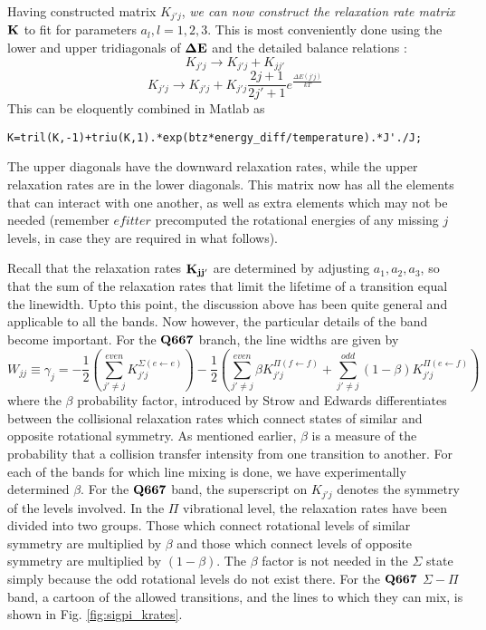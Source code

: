 \documentclass[11pt]{article}
\begin{document}
Having constructed matrix $K_{j'j}$, {\it we can now construct the 
relaxation rate matrix ${\bf K}$} to fit for parameters $a_{l}, l=1,2,3$. 
This is most conveniently done using the lower and upper tridiagonals 
of ${\bf \Delta E}$ and the detailed balance relations : 
\[
K_{j'j} \rightarrow K_{j'j} + K_{jj'} 
\]
\[
K_{j'j} \rightarrow K_{j'j} + 
               K_{j'j} \frac{2j+1}{2j'+1} e^{\frac{\Delta E(j'j)}{kT}}
\]
This can be eloquently combined in Matlab as 
\begin{verbatim}
K=tril(K,-1)+triu(K,1).*exp(btz*energy_diff/temperature).*J'./J;
\end{verbatim}
The upper diagonals have the downward relaxation rates, while the upper 
relaxation rates are in the lower diagonals. This matrix now has all the 
elements that can interact with one another, as well as extra elements 
which may not be needed (remember $efitter$ precomputed the rotational 
energies of any missing $j$ levels, in case they are required in what 
follows).

Recall that the relaxation rates ${\bf K_{jj'}}$ are determined
by adjusting $a_{1},a_{2},a_{3}$, so that the sum of the relaxation rates
that limit the lifetime of a transition equal the linewidth. 
Upto this point, the discussion above has been quite general and applicable
to all the bands. Now however, the particular details of the band become 
important. For the $\bf{Q 667}$ branch, the line widths are given by
\[
   W_{jj}\equiv\gamma_{j}=-\frac{1}{2}\left(
   \sum_{j'\neq j}^{even}K_{j'j}^{\Sigma(e\leftarrow e)}\right)-
   \frac{1}{2}\left(
   \sum_{j'\neq j}^{even}\beta K_{j'j}^{\Pi(f\leftarrow f)}+
   \sum_{j'\neq j}^{odd}(1-\beta)K_{j'j}^{\Pi(e\leftarrow f)}\right)
\]
where the $\beta$ probability factor, introduced by Strow and
Edwards \cite{edw:91} differentiates between the collisional relaxation
rates which connect states of similar and opposite rotational
symmetry. As mentioned earlier, $\beta$ is a measure of the probability that
a collision transfer intensity from one transition to another. For each of 
the bands for which line mixing is done, we have experimentally 
determined $\beta$. 
For the ${\bf Q 667}$ band, the superscript on $K_{j'j}$ denotes the 
symmetry of the levels involved.  In the $\Pi$ vibrational level, the 
relaxation rates have
been divided into two groups.  Those which connect rotational levels of
similar symmetry are multiplied by $\beta$ and those which connect levels
of opposite symmetry are multiplied by $(1-\beta)$.  The $\beta$ factor is
not needed in the $\Sigma$ state simply because the odd rotational levels
do not exist there. For the ${\bf Q 667}$ $\Sigma-\Pi$ band, a cartoon of 
the allowed transitions, and the lines
to which they can mix, is shown in Fig. \ref{fig:sigpi_krates}.
\end{document}
